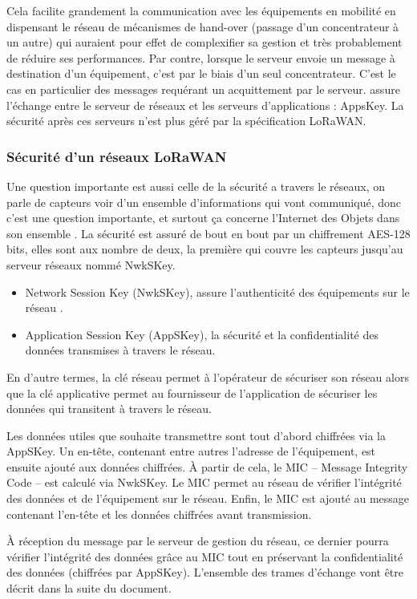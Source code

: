 \documentclass[11pt]{article}
\begin{document}
Cela facilite grandement la communication avec les équipements en mobilité en dispensant le réseau de mécanismes de hand-over (passage d’un concentrateur à un autre) qui auraient pour effet de complexifier sa gestion et très probablement de réduire ses performances. Par contre, lorsque le serveur envoie un message à destination d’un équipement, c’est par le biais d’un seul concentrateur. C’est le cas en particulier des messages requérant un acquittement par le serveur.
 assure l'échange entre le serveur de réseaux et les serveurs d'applications : AppsKey. La sécurité après ces serveurs n'est plus géré par la spécification LoRaWAN.
 

\subsubsection{Sécurité d'un réseaux LoRaWAN}
Une question importante est aussi celle de la sécurité a travers le réseaux, on parle de capteurs voir d'un ensemble d'informations qui vont communiqué, donc c'est une question importante, et surtout ça concerne l'Internet des Objets dans son ensemble .
La sécurité est assuré de bout en bout par un chiffrement AES-128 bits, elles sont aux nombre de deux, la première qui couvre les capteurs jusqu'au serveur réseaux nommé NwkSKey.
\begin{itemize}
\item Network Session Key (NwkSKey), assure l’authenticité des équipements sur le réseau .
\item Application Session Key (AppSKey), la sécurité et la confidentialité des données transmises à travers le réseau.
\end{itemize}

En d’autre termes, la clé réseau permet à l’opérateur de sécuriser son réseau alors que la clé applicative permet au fournisseur de l’application de sécuriser les données qui transitent à travers le réseau.

Les données utiles que souhaite transmettre sont tout d’abord chiffrées via la AppSKey. Un en-tête, contenant entre autres l’adresse de l’équipement, est ensuite ajouté aux données chiffrées. À partir de cela, le MIC – Message Integrity Code – est calculé via NwkSKey. Le MIC permet au réseau de vérifier l’intégrité des données et de l’équipement sur le réseau. Enfin, le MIC est ajouté au message contenant l’en-tête et les données chiffrées avant transmission.

À réception du message par le serveur de gestion du réseau, ce dernier pourra vérifier l’intégrité des données grâce au MIC tout en préservant la confidentialité des données (chiffrées par AppSKey).
L'ensemble des trames d'échange vont être décrit dans la suite du document.
\end{document}
